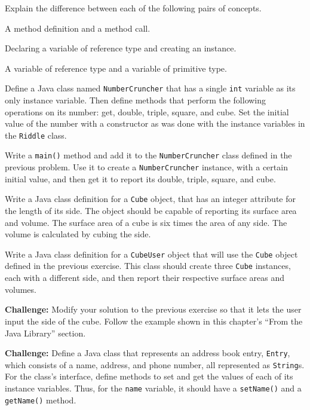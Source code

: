 \begin{EXRtwo}
\item  Explain the difference between each of the following pairs of
concepts.

\begin{EXRtwoLL}
\item  A method definition and a method call.
\item  Declaring a variable of reference type and creating an instance.
\item  A variable of reference type and a variable of primitive type.
\end{EXRtwoLL}

\item  Define a Java class named {\tt NumberCruncher} that has
a single {\tt int} variable as its only instance variable.   Then
define methods that perform the following operations on its number:
get, double, triple, square, and cube.  Set the initial value of the
number with a constructor as was done with the
instance variables in the {\tt Riddle} class.

\item  Write a {\tt main()} method and add it to the
{\tt NumberCruncher} class defined in the previous problem.   Use it to
create a {\tt NumberCruncher} instance, with a certain initial value,
and then get it to report its double, triple, square, and cube.


\item  Write a Java class definition for a {\tt Cube}
object, that has an integer attribute for the length of its side.  The
object should be capable of reporting its surface area and volume.
The surface area of a cube is six times the area of any side.  The
volume is calculated by cubing the side.

\item  Write a Java class definition for a {\tt CubeUser}
object that will use the {\tt Cube} object defined in the previous
exercise.  This class should create three {\tt Cube} instances, each
with a different side, and then report their respective surface areas
and volumes.

\item  {\bf Challenge:} Modify your solution to the previous
exercise so that it lets the user input the side of the
cube.  Follow the example shown in this chapter's ``From the Java
Library'' section.

\item  {\bf Challenge:} Define a Java class that represents an address
book entry, {\tt Entry}, which consists of a name, address, and phone
number, all represented as {\tt String}s.  For the class's interface,
define methods to set and get the values of each of its instance
variables.  Thus, for the {\tt name} variable, it should have
a {\tt setName()} and a {\tt getName()} method.


\end{EXRtwo}
